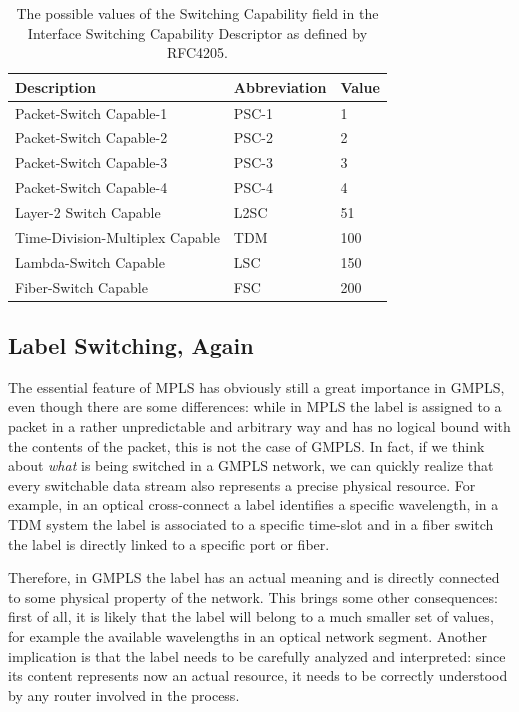 \documentclass[10pt,a4paper]{report}
\begin{document}
\begin{table}[!hbp]
  \begin{center}
    \begin{tabular}{|l|l|l|}
      \hline
      Description & Abbreviation & Value \\ \hline
      Packet-Switch Capable-1 & PSC-1 & 1 \\
      Packet-Switch Capable-2 & PSC-2 & 2 \\
      Packet-Switch Capable-3 & PSC-3 & 3 \\
      Packet-Switch Capable-4 & PSC-4 & 4 \\
      Layer-2 Switch Capable & L2SC & 51 \\
      Time-Division-Multiplex Capable & TDM & 100 \\
      Lambda-Switch Capable & LSC & 150 \\
      Fiber-Switch Capable & FSC & 200 \\
      \hline
    \end{tabular}
    \caption[Interface Switching Capability Descriptors]{The possible
      values of the Switching Capability field in the Interface
      Switching Capability Descriptor as defined by RFC4205.}
    \label{tab:gmpls_iscd}
  \end{center}
\end{table}

\subsection{Label Switching, Again}
The essential feature of MPLS has obviously still a great importance
in GMPLS, even though there are some differences: while in MPLS the
label is assigned to a packet in a rather unpredictable and arbitrary
way and has no logical bound with the contents of the packet, this is
not the case of GMPLS\@. In fact, if we think about \textit{what} is
being switched in a GMPLS network, we can quickly realize that every
switchable data stream also represents a precise physical
resource. For example, in an optical cross-connect a label identifies
a specific wavelength, in a TDM system the label is associated to a
specific time-slot and in a fiber switch the label is directly linked
to a specific port or fiber.

Therefore, in GMPLS the label has an actual meaning and is directly
connected to some physical property of the network. This brings some
other consequences: first of all, it is likely that the label will
belong to a much smaller set of values, for example the available
wavelengths in an optical network segment. Another implication is that
the label needs to be carefully analyzed and interpreted: since its
content represents now an actual resource, it needs to be correctly
understood by any router involved in the process.
\end{document}
